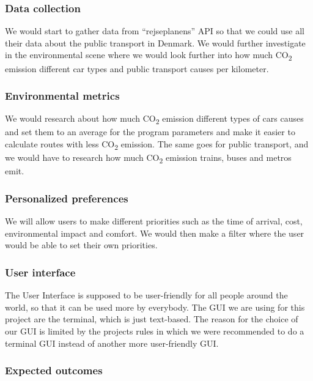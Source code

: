 \subsubsection{Data collection}

We would start to gather data from ``rejseplanens'' API so that we could use all their data about the public transport
in Denmark.
We would further investigate in the environmental scene where we would look further into how much \unit{CO_{2}} emission
different car types and public transport causes per kilometer.

\subsubsection{Environmental metrics}

We would research about how much \unit{CO_{2}} emission different types of cars causes and set them to an average for
the program parameters and make it easier to calculate routes with less \unit{CO_{2}} emission.
The same goes for public transport, and we would have to research how much \unit{CO_{2}} emission trains, buses and
metros emit.

\subsubsection{Personalized preferences}

We will allow users to make different priorities such as the time of arrival, cost, environmental impact and comfort.
We would then make a filter where the user would be able to set their own priorities.


\subsubsection{User interface}

The User Interface is supposed to be user-friendly for all people around the world, so that it can be used more by
everybody.
The GUI we are using for this project are the terminal, which is just text-based.
The reason for the choice of our GUI is limited by the projects rules in which we were recommended to do a terminal GUI
instead of another more user-friendly GUI\@.


\subsubsection{Expected outcomes}

